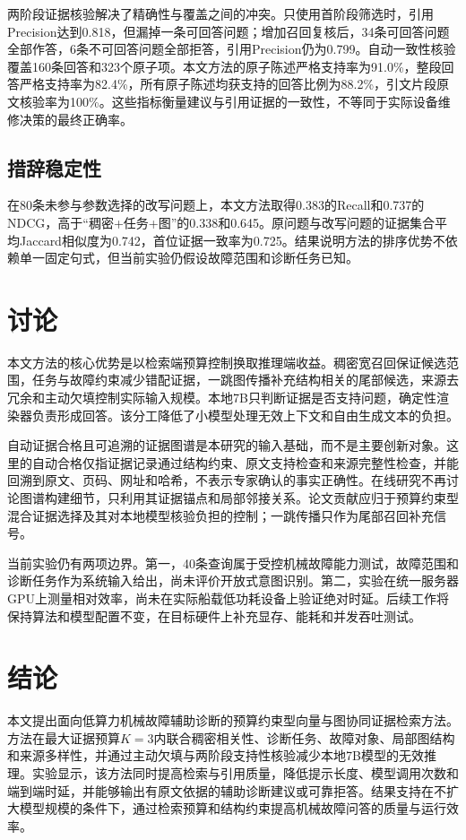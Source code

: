 \documentclass[conference]{IEEEtran}
\begin{document}
两阶段证据核验解决了精确性与覆盖之间的冲突。只使用首阶段筛选时，引用Precision达到0.818，但漏掉一条可回答问题；增加召回复核后，34条可回答问题全部作答，6条不可回答问题全部拒答，引用Precision仍为0.799。自动一致性核验覆盖160条回答和323个原子项。本文方法的原子陈述严格支持率为91.0\%，整段回答严格支持率为82.4\%，所有原子陈述均获支持的回答比例为88.2\%，引文片段原文核验率为100\%。这些指标衡量建议与引用证据的一致性，不等同于实际设备维修决策的最终正确率。

\subsection{措辞稳定性}

在80条未参与参数选择的改写问题上，本文方法取得0.383的Recall和0.737的NDCG，高于“稠密+任务+图”的0.338和0.645。原问题与改写问题的证据集合平均Jaccard相似度为0.742，首位证据一致率为0.725。结果说明方法的排序优势不依赖单一固定句式，但当前实验仍假设故障范围和诊断任务已知。

\section{讨论}

本文方法的核心优势是以检索端预算控制换取推理端收益。稠密宽召回保证候选范围，任务与故障约束减少错配证据，一跳图传播补充结构相关的尾部候选，来源去冗余和主动欠填控制实际输入规模。本地7B只判断证据是否支持问题，确定性渲染器负责形成回答。该分工降低了小模型处理无效上下文和自由生成文本的负担。

自动证据合格且可追溯的证据图谱是本研究的输入基础，而不是主要创新对象。这里的自动合格仅指证据记录通过结构约束、原文支持检查和来源完整性检查，并能回溯到原文、页码、网址和哈希，不表示专家确认的事实正确性。在线研究不再讨论图谱构建细节，只利用其证据锚点和局部邻接关系。论文贡献应归于预算约束型混合证据选择及其对本地模型核验负担的控制；一跳传播只作为尾部召回补充信号。

当前实验仍有两项边界。第一，40条查询属于受控机械故障能力测试，故障范围和诊断任务作为系统输入给出，尚未评价开放式意图识别。第二，实验在统一服务器GPU上测量相对效率，尚未在实际船载低功耗设备上验证绝对时延。后续工作将保持算法和模型配置不变，在目标硬件上补充显存、能耗和并发吞吐测试。

\section{结论}

本文提出面向低算力机械故障辅助诊断的预算约束型向量与图协同证据检索方法。方法在最大证据预算$K=3$内联合稠密相关性、诊断任务、故障对象、局部图结构和来源多样性，并通过主动欠填与两阶段支持性核验减少本地7B模型的无效推理。实验显示，该方法同时提高检索与引用质量，降低提示长度、模型调用次数和端到端时延，并能够输出有原文依据的辅助诊断建议或可靠拒答。结果支持在不扩大模型规模的条件下，通过检索预算和结构约束提高机械故障问答的质量与运行效率。
\end{document}
